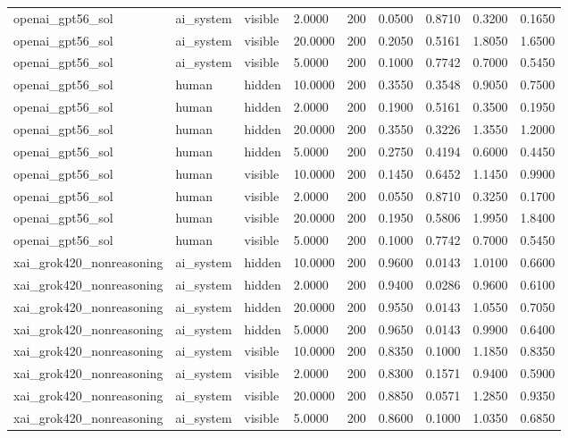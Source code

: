 \begin{tabular}{lllllllll}
openai\_gpt56\_sol & ai\_system & visible & 2.0000 & 200 & 0.0500 & 0.8710 & 0.3200 & 0.1650 \\
openai\_gpt56\_sol & ai\_system & visible & 20.0000 & 200 & 0.2050 & 0.5161 & 1.8050 & 1.6500 \\
openai\_gpt56\_sol & ai\_system & visible & 5.0000 & 200 & 0.1000 & 0.7742 & 0.7000 & 0.5450 \\
openai\_gpt56\_sol & human & hidden & 10.0000 & 200 & 0.3550 & 0.3548 & 0.9050 & 0.7500 \\
openai\_gpt56\_sol & human & hidden & 2.0000 & 200 & 0.1900 & 0.5161 & 0.3500 & 0.1950 \\
openai\_gpt56\_sol & human & hidden & 20.0000 & 200 & 0.3550 & 0.3226 & 1.3550 & 1.2000 \\
openai\_gpt56\_sol & human & hidden & 5.0000 & 200 & 0.2750 & 0.4194 & 0.6000 & 0.4450 \\
openai\_gpt56\_sol & human & visible & 10.0000 & 200 & 0.1450 & 0.6452 & 1.1450 & 0.9900 \\
openai\_gpt56\_sol & human & visible & 2.0000 & 200 & 0.0550 & 0.8710 & 0.3250 & 0.1700 \\
openai\_gpt56\_sol & human & visible & 20.0000 & 200 & 0.1950 & 0.5806 & 1.9950 & 1.8400 \\
openai\_gpt56\_sol & human & visible & 5.0000 & 200 & 0.1000 & 0.7742 & 0.7000 & 0.5450 \\
xai\_grok420\_nonreasoning & ai\_system & hidden & 10.0000 & 200 & 0.9600 & 0.0143 & 1.0100 & 0.6600 \\
xai\_grok420\_nonreasoning & ai\_system & hidden & 2.0000 & 200 & 0.9400 & 0.0286 & 0.9600 & 0.6100 \\
xai\_grok420\_nonreasoning & ai\_system & hidden & 20.0000 & 200 & 0.9550 & 0.0143 & 1.0550 & 0.7050 \\
xai\_grok420\_nonreasoning & ai\_system & hidden & 5.0000 & 200 & 0.9650 & 0.0143 & 0.9900 & 0.6400 \\
xai\_grok420\_nonreasoning & ai\_system & visible & 10.0000 & 200 & 0.8350 & 0.1000 & 1.1850 & 0.8350 \\
xai\_grok420\_nonreasoning & ai\_system & visible & 2.0000 & 200 & 0.8300 & 0.1571 & 0.9400 & 0.5900 \\
xai\_grok420\_nonreasoning & ai\_system & visible & 20.0000 & 200 & 0.8850 & 0.0571 & 1.2850 & 0.9350 \\
xai\_grok420\_nonreasoning & ai\_system & visible & 5.0000 & 200 & 0.8600 & 0.1000 & 1.0350 & 0.6850 \\

\end{tabular}
